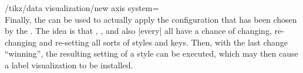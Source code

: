 \begin{key}{/tikz/data visualization/new axis system=\\ %
}
    Finally, the  can be used to actually apply the configuration that has been chosen by the . The idea is that , , and also |every|  all have a chance of changing, re-changing and re-setting all sorts of styles and keys. Then, with the last change ``winning'', the resulting setting of a style can be executed, which may then cause a label visualization to be installed.
\end{key}

\fi